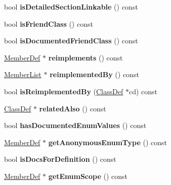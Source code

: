 \begin{DoxyCompactItemize}
bool {\bfseries is\+Detailed\+Section\+Linkable} () const
\item 
\mbox{\label{class_member_def_a67b2eabf9fd913e57173196b931c3d38}} 
bool {\bfseries is\+Friend\+Class} () const
\item 
\mbox{\label{class_member_def_ab2108e61cdeb262e89343aca4792106b}} 
bool {\bfseries is\+Documented\+Friend\+Class} () const
\item 
\mbox{\label{class_member_def_a873f1142ebb3fe5468d52fe7f3879503}} 
\mbox{\hyperlink{class_member_def}{Member\+Def}} $\ast$ {\bfseries reimplements} () const
\item 
\mbox{\label{class_member_def_a12eeec5dd5befde3d96c6498953f3c4e}} 
\mbox{\hyperlink{class_member_list}{Member\+List}} $\ast$ {\bfseries reimplemented\+By} () const
\item 
\mbox{\label{class_member_def_aac267866ed158c7cf20aa78d9fe627dc}} 
bool {\bfseries is\+Reimplemented\+By} (\mbox{\hyperlink{class_class_def}{Class\+Def}} $\ast$cd) const
\item 
\mbox{\label{class_member_def_aaa81f6ae193563a8d79f2d6bbb2a8374}} 
\mbox{\hyperlink{class_class_def}{Class\+Def}} $\ast$ {\bfseries related\+Also} () const
\item 
\mbox{\label{class_member_def_ac0184a9b4abc319d37d593723590de91}} 
bool {\bfseries has\+Documented\+Enum\+Values} () const
\item 
\mbox{\label{class_member_def_a1acb0211c64fbf3b661e6aabf302598d}} 
\mbox{\hyperlink{class_member_def}{Member\+Def}} $\ast$ {\bfseries get\+Anonymous\+Enum\+Type} () const
\item 
\mbox{\label{class_member_def_a207299c144406539c9f191af68ca3e4d}} 
bool {\bfseries is\+Docs\+For\+Definition} () const
\item 
\mbox{\label{class_member_def_a25fee48e12ff1037e089fdcbc5219624}} 
\mbox{\hyperlink{class_member_def}{Member\+Def}} $\ast$ {\bfseries get\+Enum\+Scope} () const

\end{DoxyCompactItemize}
